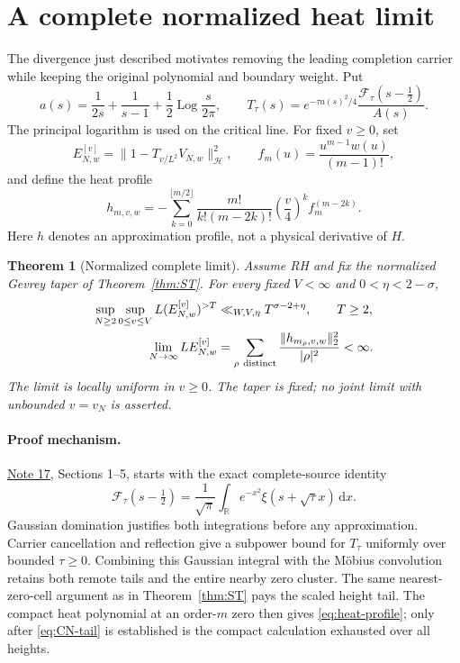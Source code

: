 \documentclass[11pt]{article}
\newtheorem{theorem}{Theorem}
\DeclareMathOperator{\Log}{Log}
\newcommand{\dd}{\,\mathrm d}
\newcommand{\CNref}{\href{../notes/17_NORMALIZED_HEAT_GLOBAL_LIMIT_AND_ARITHMETIC_COSTS_20261020.md}{Note 17}}
\begin{document}
\section{A complete normalized heat limit}\label{sec:normalized}
The divergence just described motivates removing the leading completion
carrier while keeping the original polynomial and boundary weight. Put
\begin{equation}\label{eq:normalized-target}
 a(s)=\frac1{2s}+\frac1{s-1}+\frac12\Log\frac{s}{2\pi},\qquad
 T_\tau(s)=e^{-\tau a(s)^2/4}
                \frac{\mathcal F_\tau(s-\frac12)}{A(s)}.
\end{equation}
The principal logarithm is used on the critical line. For fixed
\(v\ge0\), set
\[
 E_{N,w}^{[v]}=\|1-T_{v/L^2}V_{N,w}\|_{\mathcal H}^2,\qquad
 f_m(u)=\frac{u^{m-1}w(u)}{(m-1)!},
\]
and define the heat profile
\begin{equation}\label{eq:heat-profile}
 h_{m,v,w}=-\sum_{k=0}^{\lfloor m/2\rfloor}
       \frac{m!}{k!(m-2k)!}\left(\frac v4\right)^k f_m^{(m-2k)}.
\end{equation}
Here \(h\) denotes an approximation profile, not a physical derivative
of \(H\).

\begin{theorem}[Normalized complete limit]\label{thm:CN}
Assume RH and fix the normalized Gevrey taper of
Theorem~\ref{thm:ST}. For every fixed \(V<\infty\) and
\(0<\eta<2-\sigma\),
\begin{align}
 \sup_{N\ge2}\sup_{0\le v\le V}
       L(E_{N,w}^{[v]})^{>T}
       &\ll_{W,V,\eta}T^{\sigma-2+\eta},\qquad T\ge2,
       \label{eq:CN-tail}\\
 \lim_{N\to\infty}L E_{N,w}^{[v]}
       &=\sum_{\rho\ {\rm distinct}}
          \frac{\|h_{m_\rho,v,w}\|_2^2}{|\rho|^2}<\infty.
       \label{eq:CN-limit}
\end{align}
The limit is locally uniform in \(v\ge0\). The taper is fixed;
no joint limit with unbounded \(v=v_N\) is asserted.
\end{theorem}

\paragraph{Proof mechanism.}
\CNref, Sections 1--5, starts with the exact complete-source identity
\[
 \mathcal F_\tau(s-\tfrac12)=\frac1{\sqrt\pi}
       \int_{\mathbb R}e^{-x^2}\xi(s+\sqrt\tau x)\dd x.
\]
Gaussian domination justifies both integrations before any approximation.
Carrier cancellation and reflection give a subpower bound for
\(T_\tau\) uniformly over bounded \(\tau\ge0\). Combining this
Gaussian integral with the M\"obius convolution retains both remote
tails and the entire nearby zero cluster. The same nearest-zero-cell
argument as in Theorem~\ref{thm:ST} pays the scaled height tail.
The compact heat polynomial at an order-\(m\) zero then gives
\eqref{eq:heat-profile}; only after \eqref{eq:CN-tail} is established
is the compact calculation exhausted over all heights.
\end{document}
